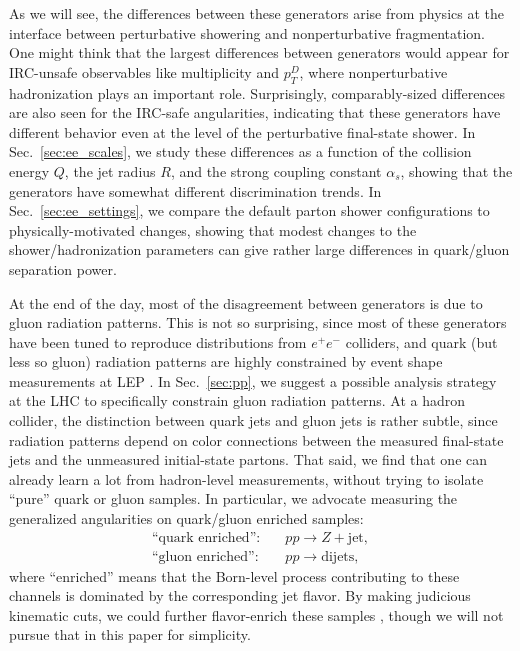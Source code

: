 \documentclass[11pt,letterpaper]{article}
\DeclareRobustCommand{\Sec}[1]{Sec.~\ref{#1}}
\begin{document}
As we will see, the differences between these generators arise from
physics at the interface between perturbative showering and
nonperturbative fragmentation.  One might think that the largest
differences between generators would appear for IRC-unsafe observables
like multiplicity and $p_T^D$, where nonperturbative hadronization
plays an important role.  Surprisingly, comparably-sized differences
are also seen for the IRC-safe angularities, indicating that these
generators have different behavior even at the level of the
perturbative final-state shower.  In \Sec{sec:ee_scales}, we study
these differences as a function of the collision energy $Q$, the jet
radius $R$, and the strong coupling constant $\alpha_s$, showing that
the generators have somewhat different discrimination trends.  In
\Sec{sec:ee_settings}, we compare the default parton shower
configurations to physically-motivated changes, showing that modest
changes to the shower/hadronization parameters can give rather large
differences in quark/gluon separation power.

At the end of the day, most of the disagreement between generators is due to gluon radiation patterns.  This is not so surprising, since most of these generators have been tuned to reproduce distributions from $e^+ e^-$ colliders, and quark (but less so gluon) radiation patterns are highly constrained by event shape measurements at LEP \cite{Heister:2003aj,Abdallah:2003xz,Achard:2004sv,Abbiendi:2004qz}.  In \Sec{sec:pp}, we suggest a possible analysis strategy at the LHC to specifically constrain gluon radiation patterns.  At a hadron collider, the distinction between quark jets and gluon jets is rather subtle, since radiation patterns depend on color connections between the measured final-state jets and the unmeasured initial-state partons.  That said, we find that one can already learn a lot from hadron-level measurements, without trying to isolate ``pure'' quark or gluon samples.  In particular, we advocate measuring the generalized angularities on quark/gluon enriched samples:
\begin{align}
\text{``quark enriched''}: \quad & pp \to Z + \text{jet}, \\
\text{``gluon enriched''}: \quad & pp \to \text{dijets},
\end{align}
where ``enriched'' means that the Born-level process contributing to these channels is dominated by the corresponding jet flavor.  By making judicious kinematic cuts, we could further flavor-enrich these samples \cite{Gallicchio:2011xc}, though we will not pursue that in this paper for simplicity.
\end{document}
